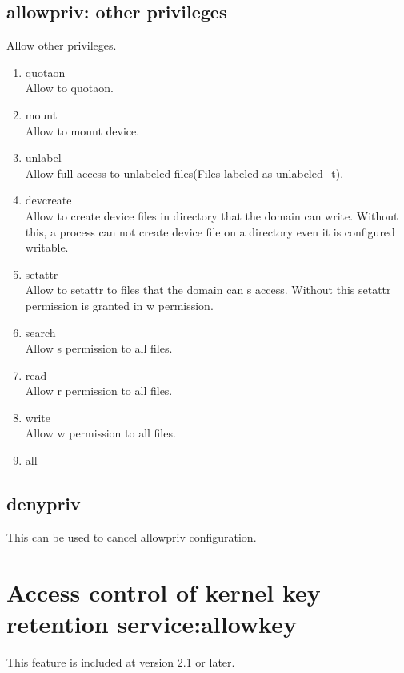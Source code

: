 \documentclass{article}
\begin{document}
\subsection{allowpriv: other privileges}
       Allow other privileges.
       \begin{enumerate}

	\item quotaon\\         
	      Allow to quotaon.
	\item mount\\         
	      Allow to mount device.

	\item unlabel\\
	      Allow full access to unlabeled files(Files labeled as
	      unlabeled\_t).

	\item devcreate\\
	      Allow to create device files in directory that the domain can write.
	      Without this, a process can not create device
	      file on a directory even it is configured writable.
	\item setattr\\
	      Allow to setattr to files that the domain can s
	      access. Without this setattr permission is granted in w permission.	\item search\\
	      Allow s permission to all files.
	\item read\\
	      Allow r permission to all files.
	\item write\\
	      Allow w permission to all files.
	\item all\\
       \end{enumerate}     

\subsection{denypriv}
This can be used to cancel allowpriv configuration.

\section{Access control of kernel key retention service:allowkey}
This feature is included at version  2.1 or  later.\\
\end{document}
